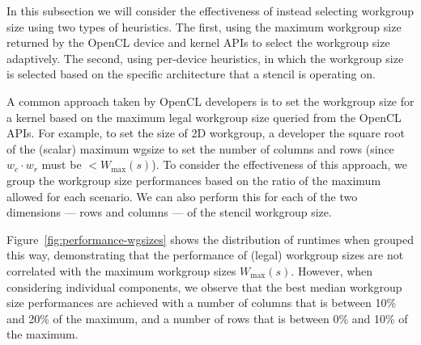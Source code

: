 \documentclass[nonatbib,preprint,9pt]{sigplanconf}
\begin{document}

In this subsection we will consider the effectiveness of instead
selecting workgroup size using two types of heuristics. The first,
using the maximum workgroup size returned by the OpenCL device and
kernel APIs to select the workgroup size adaptively. The second, using
per-device heuristics, in which the workgroup size is selected based
on the specific architecture that a stencil is operating on.


A common approach taken by OpenCL developers is to set the workgroup
size for a kernel based on the maximum legal workgroup size queried
from the OpenCL APIs. For example, to set the size of 2D workgroup, a
developer the square root of the (scalar) maximum wgsize to set the
number of columns and rows (since $w_c \cdot w_r$ must be
$< W_{\max}(s)$). To consider the effectiveness of this approach, we
group the workgroup size performances based on the ratio of the
maximum allowed for each scenario. We can also perform this for each
of the two dimensions --- rows and columns --- of the stencil
workgroup size.

Figure~\ref{fig:performance-wgsizes} shows the distribution of
runtimes when grouped this way, demonstrating that the performance of
(legal) workgroup sizes are not correlated with the maximum workgroup
sizes $W_{\max}(s)$. However, when considering individual components,
we observe that the best median workgroup size performances are
achieved with a number of columns that is between 10\% and 20\% of the
maximum, and a number of rows that is between 0\% and 10\% of the
maximum.

\end{document}
